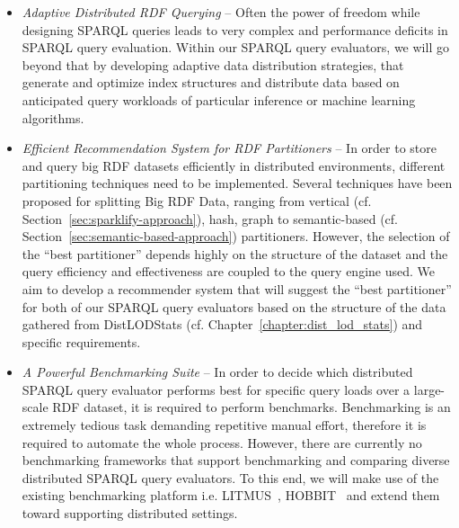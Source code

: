 \begin{itemize} 
  \item \textit{Adaptive Distributed \gls{RDF} Querying} -- 
  Often the power of freedom while designing \gls{SPARQL} queries leads to very complex and performance deficits in \gls{SPARQL} query evaluation.
  Within our \gls{SPARQL} query evaluators, we will go beyond that by developing adaptive data distribution strategies, that generate and optimize index structures and distribute data based on anticipated query workloads of particular inference or machine learning algorithms.
  
  \item \textit{Efficient Recommendation System for \gls{RDF} Partitioners} -- 
  In order to store and query big \gls{RDF} datasets efficiently in distributed environments, different partitioning techniques need to be implemented. 
  Several techniques have been proposed for splitting Big \gls{RDF} Data, ranging from vertical (cf. Section~\ref{sec:sparklify-approach}), hash, graph to semantic-based (cf. Section~\ref{sec:semantic-based-approach}) partitioners. 
  However, the selection of the “best partitioner” depends highly on the structure of the dataset and the query efficiency and effectiveness are coupled to the query engine used. 
  We aim to develop a recommender system that will suggest the “best partitioner” for both of our \gls{SPARQL} query evaluators based on the structure of the data gathered from DistLODStats (cf. Chapter~\ref{chapter:dist_lod_stats}) and specific requirements.
  
  \item \textit{A Powerful Benchmarking Suite} -- 
  In order to decide which distributed \gls{SPARQL} query evaluator performs best for specific query loads over a large-scale \gls{RDF} dataset, it is required to perform benchmarks. 
  Benchmarking is an extremely tedious task demanding repetitive manual effort, therefore it is required to automate the whole process.
  However, there are currently no benchmarking frameworks that support benchmarking and comparing diverse distributed \gls{SPARQL} query evaluators.
  To this end, we will make use of the existing benchmarking platform i.e. LITMUS~\cite{ThakkarEtAl:LITMUS16}, HOBBIT~\cite{Roeder2019Hobbit} and extend them toward supporting distributed settings.
\end{itemize}

